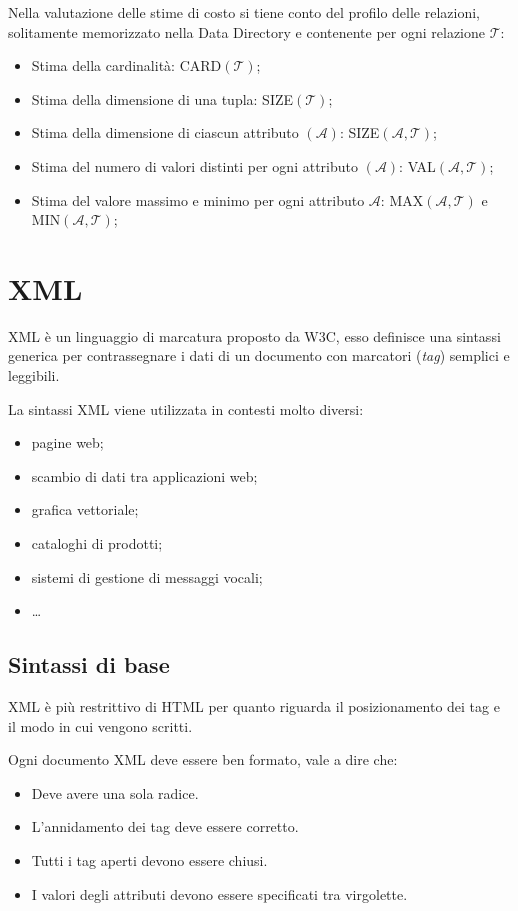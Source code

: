 \documentclass[oneside,a4paper,11pt]{book}
\theoremstyle{italicstyle}
\theoremstyle{normStyle}
\begin{document}
Nella valutazione delle stime di costo si tiene conto del profilo delle relazioni, solitamente 
memorizzato nella Data Directory e contenente per ogni relazione $\mathcal{T}$:
\begin{itemize}
  \item Stima della cardinalità: CARD$(\mathcal{T})$;
  \item Stima della dimensione di una tupla: SIZE$(\mathcal{T})$;
  \item Stima della dimensione di ciascun attributo $(\mathcal{A})$: SIZE$(\mathcal{A},\mathcal{T})$;
  \item Stima del numero di valori distinti per ogni attributo $(\mathcal{A})$: VAL$(\mathcal{A},\mathcal{T})$;
  \item Stima del valore massimo e minimo per ogni attributo $\mathcal{A}$:
  MAX$(\mathcal{A},\mathcal{T})$ e MIN$(\mathcal{A},\mathcal{T})$;
\end{itemize}
\chapter{XML}
XML è un linguaggio di marcatura proposto da W3C, esso definisce una sintassi 
generica per contrassegnare i dati di un documento con marcatori (\textit{tag}) 
semplici e leggibili.

La sintassi XML viene utilizzata in contesti molto diversi:
\begin{itemize}
  \item pagine web;
  \item scambio di dati tra applicazioni web;
  \item grafica vettoriale;
  \item cataloghi di prodotti;
  \item sistemi di gestione di messaggi vocali;
  \item \dots
\end{itemize}
\section{Sintassi di base}
XML è più restrittivo di HTML per quanto riguarda il posizionamento dei tag e 
il modo in cui vengono scritti.

Ogni documento XML deve essere ben formato, vale a dire che:
\begin{itemize}
  \item Deve avere una sola radice.
  \item L'annidamento dei tag deve essere corretto.
  \item Tutti i tag aperti devono essere chiusi.
  \item I valori degli attributi devono essere specificati tra virgolette.
\end{itemize}
\end{document}
